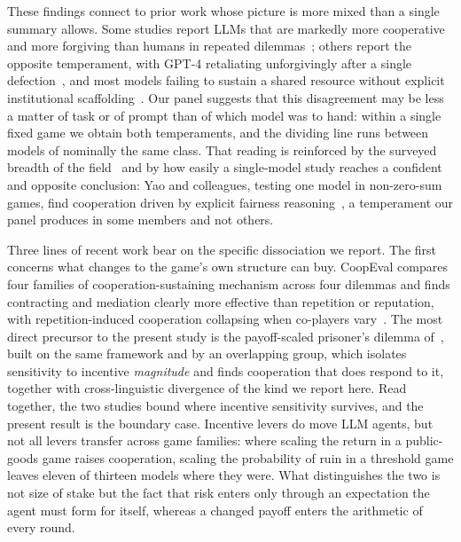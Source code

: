 \documentclass[openacc]{rsproca_new}
\begin{document}
These findings connect to prior work whose picture is more mixed than a single summary allows. Some studies report LLMs that are markedly more cooperative and more forgiving than humans in repeated dilemmas~\cite{fontana2024nicer,phelps2023investigating}; others report the opposite temperament, with GPT-4 retaliating unforgivingly after a single defection~\cite{akata2023playing}, and most models failing to sustain a shared resource without explicit institutional scaffolding~\cite{piatti2024cooperate}. Our panel suggests that this disagreement may be less a matter of task or of prompt than of which model was to hand: within a single fixed game we obtain both temperaments, and the dividing line runs between models of nominally the same class. That reading is reinforced by the surveyed breadth of the field~\cite{feng2024survey} and by how easily a single-model study reaches a confident and opposite conclusion: Yao and colleagues, testing one model in non-zero-sum games, find cooperation driven by explicit fairness reasoning~\cite{yao2026competition}, a temperament our panel produces in some members and not others.

Three lines of recent work bear on the specific dissociation we report. The first concerns what changes to the game's own structure can buy. CoopEval compares four families of cooperation-sustaining mechanism across four dilemmas and finds contracting and mediation clearly more effective than repetition or reputation, with repetition-induced cooperation collapsing when co-players vary~\cite{tewolde2026coopeval}. The most direct precursor to the present study is the payoff-scaled prisoner's dilemma of~\cite{huynh2025understanding}, built on the same framework and by an overlapping group, which isolates sensitivity to incentive \emph{magnitude} and finds cooperation that does respond to it, together with cross-linguistic divergence of the kind we report here. Read together, the two studies bound where incentive sensitivity survives, and the present result is the boundary case. Incentive levers do move LLM agents, but not all levers transfer across game families: where scaling the return in a public-goods game raises cooperation, scaling the probability of ruin in a threshold game leaves eleven of thirteen models where they were. What distinguishes the two is not size of stake but the fact that risk enters only through an expectation the agent must form for itself, whereas a changed payoff enters the arithmetic of every round.
\end{document}
